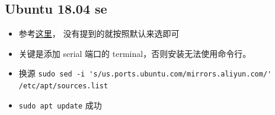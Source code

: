 
\subsection{Ubuntu 18.04 se}
\begin{itemize}
\item 参考\href{https://www.machunjie.com/linux/1570.html}{这里}， 没有提到的就按照默认来选即可
\item 关键是添加 serial 端口的 terminal，否则安装无法使用命令行。
\item 换源 \verb`sudo sed -i 's/us.ports.ubuntu.com/mirrors.aliyun.com/' /etc/apt/sources.list`
\item \verb`sudo apt update` 成功
\end{itemize}
